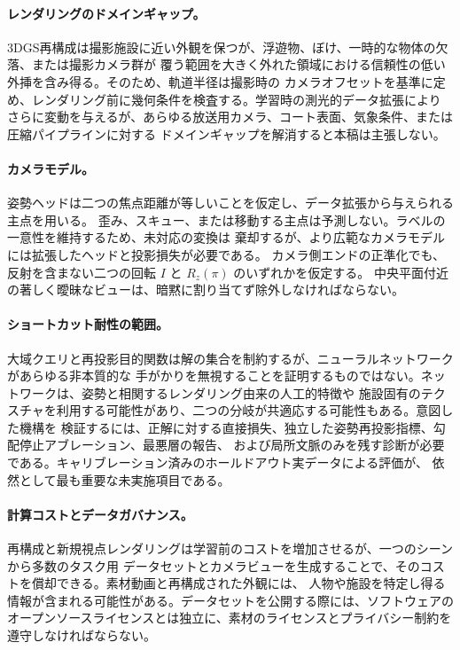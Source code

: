 \paragraph{レンダリングのドメインギャップ。}
3DGS再構成は撮影施設に近い外観を保つが、浮遊物、ぼけ、一時的な物体の欠落、または撮影カメラ群が
覆う範囲を大きく外れた領域における信頼性の低い外挿を含み得る。そのため、軌道半径は撮影時の
カメラオフセットを基準に定め、レンダリング前に幾何条件を検査する。学習時の測光的データ拡張により
さらに変動を与えるが、あらゆる放送用カメラ、コート表面、気象条件、または圧縮パイプラインに対する
ドメインギャップを解消すると本稿は主張しない。

\paragraph{カメラモデル。}
姿勢ヘッドは二つの焦点距離が等しいことを仮定し、データ拡張から与えられる主点を用いる。
歪み、スキュー、または移動する主点は予測しない。ラベルの一意性を維持するため、未対応の変換は
棄却するが、より広範なカメラモデルには拡張したヘッドと投影損失が必要である。
カメラ側エンドの正準化でも、反射を含まない二つの回転 \(I\) と \(R_z(\pi)\) のいずれかを仮定する。
中央平面付近の著しく曖昧なビューは、暗黙に割り当てず除外しなければならない。

\paragraph{ショートカット耐性の範囲。}
大域クエリと再投影目的関数は解の集合を制約するが、ニューラルネットワークがあらゆる非本質的な
手がかりを無視することを証明するものではない。ネットワークは、姿勢と相関するレンダリング由来の人工的特徴や
施設固有のテクスチャを利用する可能性があり、二つの分岐が共適応する可能性もある。意図した機構を
検証するには、正解に対する直接損失、独立した姿勢再投影指標、勾配停止アブレーション、最悪層の報告、
および局所文脈のみを残す診断が必要である。キャリブレーション済みのホールドアウト実データによる評価が、
依然として最も重要な未実施項目である。

\paragraph{計算コストとデータガバナンス。}
再構成と新規視点レンダリングは学習前のコストを増加させるが、一つのシーンから多数のタスク用
データセットとカメラビューを生成することで、そのコストを償却できる。素材動画と再構成された外観には、
人物や施設を特定し得る情報が含まれる可能性がある。データセットを公開する際には、ソフトウェアの
オープンソースライセンスとは独立に、素材のライセンスとプライバシー制約を遵守しなければならない。
